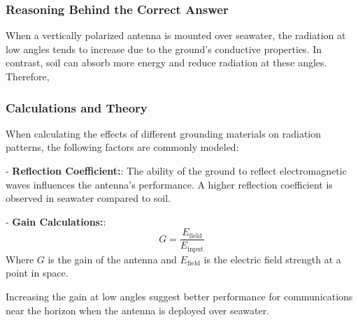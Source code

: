 \subsubsection{Reasoning Behind the Correct Answer}

When a vertically polarized antenna is mounted over seawater, the radiation at low angles tends to increase due to the ground's conductive properties. In contrast, soil can absorb more energy and reduce radiation at these angles. Therefore, 

\subsubsection{Calculations and Theory}

When calculating the effects of different grounding materials on radiation patterns, the following factors are commonly modeled:

- \textbf{Reflection Coefficient:}: The ability of the ground to reflect electromagnetic waves influences the antenna's performance. A higher reflection coefficient is observed in seawater compared to soil.

- \textbf{Gain Calculations:}:
    \[
    G = \frac{E_{\text{field}}}{E_{\text{input}}}
    \]
    Where \( G \) is the gain of the antenna and \( E_{\text{field}} \) is the electric field strength at a point in space.

Increasing the gain at low angles suggest better performance for communications near the horizon when the antenna is deployed over seawater.



    


